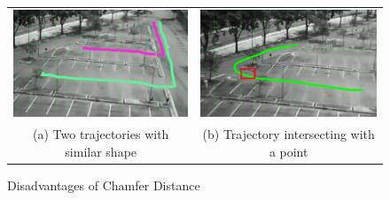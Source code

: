 \begin{figure}[htb!]
  \centering
\begin{tabular}{cc }
 \includegraphics[width=0.45\linewidth]{image/retrievalTwo/chamferDisadv2.png} &
 \includegraphics[width=0.45\linewidth]{image/retrievalTwo/chamferDisadv1.png} \\
 (a) Two trajectories with similar shape &
 (b) Trajectory intersecting with a point \\
\end{tabular}
\caption{Disadvantages of Chamfer Distance} \label{fig:chamferDisadvantage}
\end{figure}


